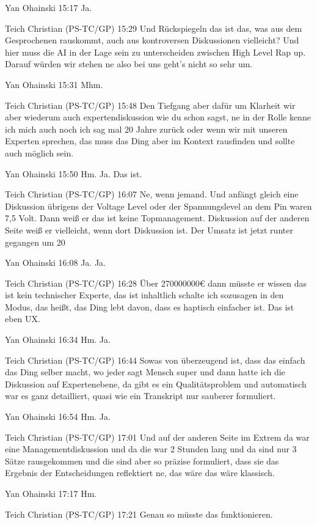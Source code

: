 Yan Ohainski   15:17
Ja.

Teich Christian (PS-TC/GP)   15:29
Und Rückspiegeln das ist das, was aus dem Gesprochenen rauskommt, auch aus kontroversen Diskussionen vielleicht? Und hier muss die AI in der Lage sein zu unterscheiden zwischen High Level Rap up. Darauf würden wir stehen ne also bei uns geht's nicht so sehr um.

Yan Ohainski   15:31
Mhm.

Teich Christian (PS-TC/GP)   15:48
Den Tiefgang aber dafür um Klarheit wir aber wiederum auch expertendiskussion wie du schon sagst, ne in der Rolle kenne ich mich auch noch ich sag mal 20 Jahre zurück oder wenn wir mit unseren Experten sprechen, das muss das Ding aber im Kontext rausfinden und sollte auch möglich sein.

Yan Ohainski   15:50
Hm.
Ja.
Das ist.

Teich Christian (PS-TC/GP)   16:07
Ne, wenn jemand.
Und anfängt gleich eine Diskussion übrigens der Voltage Level oder der Spannungslevel an dem Pin waren 7,5 Volt. Dann weiß er das ist keine Topmanagement. Diskussion auf der anderen Seite weiß er vielleicht, wenn dort Diskussion ist. Der Umsatz ist jetzt runter gegangen um 20%

Yan Ohainski   16:08
Ja.
Ja.

Teich Christian (PS-TC/GP)   16:28
Über 270000000€ dann müsste er wissen das ist kein technischer Experte, das ist inhaltlich schalte ich sozusagen in den Modus, das heißt, das Ding lebt davon, dass es haptisch einfacher ist. Das ist eben UX.

Yan Ohainski   16:34
Hm.
Ja.

Teich Christian (PS-TC/GP)   16:44
Sowas von überzeugend ist, dass das einfach das Ding selber macht, wo jeder sagt Mensch super und dann hatte ich die Diskussion auf Expertenebene, da gibt es ein Qualitätsproblem und automatisch war es ganz detailliert, quasi wie ein Transkript nur sauberer formuliert.

Yan Ohainski   16:54
Hm.
Ja.

Teich Christian (PS-TC/GP)   17:01
Und auf der anderen Seite im Extrem da war eine Managementdiskussion und da die war 2 Stunden lang und da sind nur 3 Sätze rausgekommen und die sind aber so präzise formuliert, dass sie das Ergebnis der Entscheidungen reflektiert ne, das wäre das wäre klassisch.

Yan Ohainski   17:17
Hm.

Teich Christian (PS-TC/GP)   17:21
Genau so müsste das funktionieren.

